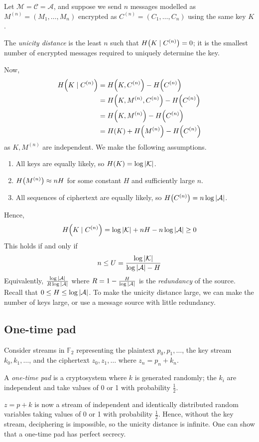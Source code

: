Let \( \mathcal M = \mathcal C = \mathcal A \), and suppose we send \( n \) messages modelled as \( M^{(n)} = (M_1, \dots, M_n) \) encrypted as \( C^{(n)} = (C_1, \dots, C_n) \) using the same key \( K \).
\begin{definition}
    The \emph{unicity distance} is the least \( n \) such that \( H\qty(K \mid C^{(n)}) = 0 \); it is the smallest number of encrypted messages required to uniquely determine the key.
\end{definition}
Now,
\begin{align*}
    H\qty(K \mid C^{(n)}) &= H\qty(K, C^{(n)}) - H\qty(C^{(n)}) \\
    &= H\qty(K, M^{(n)}, C^{(n)}) - H\qty(C^{(n)}) \\
    &= H\qty(K, M^{(n)}) - H\qty(C^{(n)}) \\
    &= H(K) + H\qty(M^{(n)}) - H\qty(C^{(n)})
\end{align*}
as \( K, M^{(n)} \) are independent.
We make the following assumptions.
\begin{enumerate}
    \item All keys are equally likely, so \( H(K) = \log \abs{\mathcal K} \).
    \item \( H\qty(M^{(n)}) \approx nH \) for some constant \( H \) and sufficiently large \( n \).
    \item All sequences of ciphertext are equally likely, so \( H\qty(C^{(n)}) = n \log \abs{\mathcal A} \).
\end{enumerate}
Hence,
\[ H\qty(K \mid C^{(n)}) = \log \abs{\mathcal K} + nH - n \log \abs{\mathcal A} \geq 0 \]
This holds if and only if
\[ n \leq U = \frac{\log \abs{\mathcal K}}{\log \abs{\mathcal A} - H} \]
Equivalently, \( \frac{\log \abs{\mathcal A}}{R\log \abs{\mathcal A}} \) where \( R = 1 - \frac{H}{\log \abs{\mathcal A}} \) is the \emph{redundancy} of the source.
Recall that \( 0 \leq H \leq \log \abs{\mathcal A} \).
To make the unicity distance large, we can make the number of keys large, or use a message source with little redundancy.

\subsection{One-time pad}
Consider streams in \( \mathbb F_2 \) representing the plaintext \( p_0, p_1, \dots \), the key stream \( k_0, k_1, \dots \), and the ciphertext \( z_0, z_1, \dots \) where \( z_n = p_n + k_n \).
\begin{definition}
    A \emph{one-time pad} is a cryptosystem where \( k \) is generated randomly; the \( k_i \) are independent and take values of 0 or 1 with probability \( \frac{1}{2} \).
\end{definition}
\( z = p + k \) is now a stream of independent and identically distributed random variables taking values of 0 or 1 with probability \( \frac{1}{2} \).
Hence, without the key stream, deciphering is impossible, so the unicity distance is infinite.
One can show that a one-time pad has perfect secrecy.

